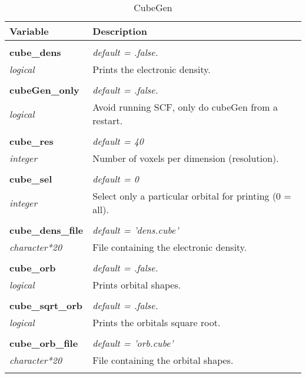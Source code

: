 \begin{Spacing}{1.0}
\begin{longtable}{ p{} p{} }

   \toprule
   \textbf{Variable} & Description \\*
   \midrule \\*
   \endhead

   \bottomrule
   \caption{CubeGen}
   \endfoot

   \textbf{cube\_dens}
   &  \textit{default = .false. }
   \\*\textit{logical}
   & Prints the electronic density.\\* \\

   \textbf{cubeGen\_only}
   &  \textit{default = .false. }
   \\*\textit{logical}
   & Avoid running SCF, only do cubeGen from a restart.\\* \\

   \textbf{cube\_res}
   &  \textit{default = 40}
   \\*\textit{integer}
   & Number of voxels per dimension (resolution).\\* \\

   \textbf{cube\_sel}
   &  \textit{default = 0}
   \\*\textit{integer}
   & Select only a particular orbital for printing (0 = all).\\* \\

   \textbf{cube\_dens\_file}
   &  \textit{default = 'dens.cube'}
   \\*\textit{character*20}
   & File containing the electronic density.\\* \\

   \textbf{cube\_orb}
   &  \textit{default = .false. }
   \\*\textit{logical}
   & Prints orbital shapes.\\* \\

   \textbf{cube\_sqrt\_orb}
   &  \textit{default = .false. }
   \\*\textit{logical}
   & Prints the orbitals square root.\\* \\

   \textbf{cube\_orb\_file}
   &  \textit{default = 'orb.cube'}
   \\*\textit{character*20}
   & File containing the orbital shapes.\\* \\


\end{longtable}
\end{Spacing}
